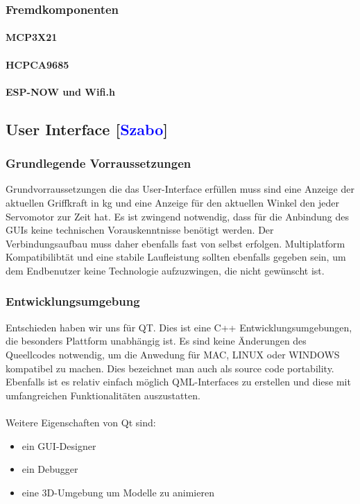 \documentclass[titlepage,12pt,twoside]{article}
\begin{document}
\subsubsection{Fremdkomponenten}

\paragraph{MCP3X21}
\hfill \break
\hfill \break

\paragraph{HCPCA9685}
\hfill \break
\hfill \break

\paragraph{ESP-NOW und Wifi.h}
\label{par:ESP-NOW und Wifi.h}
\hfill \break
\hfill \break

\newpage
\subsection{User Interface [\textcolor{blue}{Szabo}]}
\label{chap:User Interface}

\subsubsection{Grundlegende Vorraussetzungen}
Grundvorraussetzungen die das User-Interface erfüllen muss sind eine Anzeige der aktuellen Griffkraft in kg und eine Anzeige für
den aktuellen Winkel den jeder Servomotor zur Zeit hat. Es ist zwingend notwendig, dass für die Anbindung des GUIs keine technischen
Vorauskenntnisse benötigt werden. Der Verbindungsaufbau muss daher ebenfalls fast von selbst erfolgen. Multiplatform Kompatibilibtät
und eine stabile Laufleistung sollten ebenfalls gegeben sein, um dem Endbenutzer keine Technologie aufzuzwingen, die nicht gewünscht ist.

\subsubsection{Entwicklungsumgebung}

Entschieden haben wir uns für QT. Dies ist eine C++ Entwicklungsumgebungen, die besonders Plattform unabhängig ist. Es sind keine Änderungen
des Queellcodes notwendig, um die Anwedung für MAC, LINUX oder WINDOWS kompatibel zu machen. Dies bezeichnet man auch als source 
code portability. Ebenfalls ist es relativ einfach möglich QML-Interfaces zu erstellen und diese mit umfangreichen Funktionalitäten auszustatten. \\
\\ 
Weitere Eigenschaften von Qt sind:
\begin{itemize}
	\item ein GUI-Designer
	\item ein Debugger
	\item eine 3D-Umgebung um Modelle zu animieren
\end{itemize}
\end{document}
